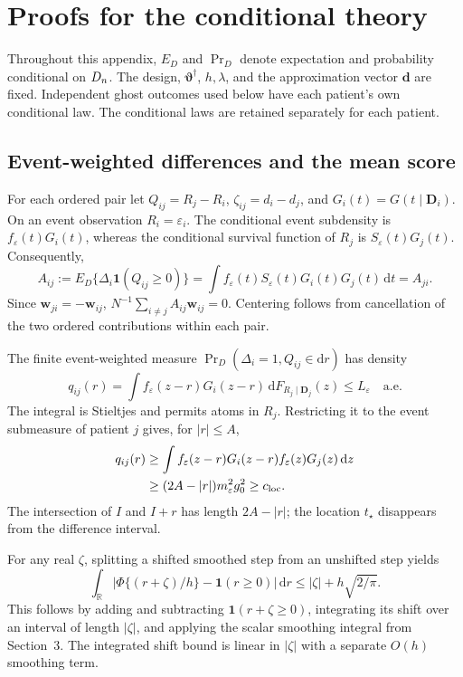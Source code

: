 \section{Proofs for the conditional theory}
\label{app:conditional-proof}
Throughout this appendix, $E_D$ and $\Pr_D$ denote expectation and probability conditional on $\mathcal \bm{D}_n$. The design, $\bm{\vartheta}^\dagger$, $h,\lambda$, and the approximation vector $\mathbf d$ are fixed. Independent ghost outcomes used below have each patient's own conditional law. The conditional laws are retained separately for each patient.

\subsection{Event-weighted differences and the mean score}
\label{subapp:score-proof}
For each ordered pair let $Q_{ij}=R_j-R_i$, $\zeta_{ij}=d_i-d_j$, and $G_i(t)=G(t\mid \bm{D}_i)$. On an event observation $R_i=\varepsilon_i$. The conditional event subdensity is $f_\varepsilon(t)G_i(t)$, whereas the conditional survival function of $R_j$ is $S_\varepsilon(t)G_j(t)$. Consequently,
\begin{equation}
 A_{ij}:=E_D\{\Delta_i\mathbf1(Q_{ij}\ge0)\}
  =\int f_\varepsilon(t)S_\varepsilon(t)G_i(t)G_j(t)\,\mathrm{d}t=A_{ji}.
 \label{eq:C-score-centering}
\end{equation}
Since $\bm{w}_{ji}=-\bm{w}_{ij}$, $N^{-1}\sum_{i\ne j}A_{ij}\bm{w}_{ij}=0$. Centering follows from cancellation of the two ordered contributions within each pair.

The finite event-weighted measure $\Pr_D(\Delta_i=1,Q_{ij}\in\mathrm{d}r)$ has density
\begin{equation}
 q_{ij}(r)=\int f_\varepsilon(z-r)G_i(z-r)\,\mathrm{d}F_{R_j\mid \bm{D}_j}(z)
       \le L_\varepsilon\quad\text{a.e.}
 \label{eq:C-event-density}
\end{equation}
The integral is Stieltjes and permits atoms in $R_j$. Restricting it to the event submeasure of patient $j$ gives, for $|r|\le A$,
\begin{align}
 q_{ij}(r)
 &\ge\int f_\varepsilon(z-r)G_i(z-r)f_\varepsilon(z)G_j(z)\,\mathrm{d}z\notag\\
 &\ge(2A-|r|)m_\varepsilon^2g_0^2\ge c_{\rm loc}.
 \label{eq:C-density-lower}
\end{align}
The intersection of $I$ and $I+r$ has length $2A-|r|$; the location $t_\star$ disappears from the difference interval.

For any real $\zeta$, splitting a shifted smoothed step from an unshifted step yields
\begin{equation}
 \int_{\mathbb R}\left|\Phi\{(r+\zeta)/h\}-\mathbf1(r\ge0)\right|\,\mathrm{d}r
 \le |\zeta|+h\sqrt{2/\pi}.
 \label{eq:C-shifted-step}
\end{equation}
This follows by adding and subtracting $\mathbf1(r+\zeta\ge0)$, integrating its shift over an interval of length $|\zeta|$, and applying the scalar smoothing integral from Section~3. The integrated shift bound is linear in $|\zeta|$ with a separate $O(h)$ smoothing term.

